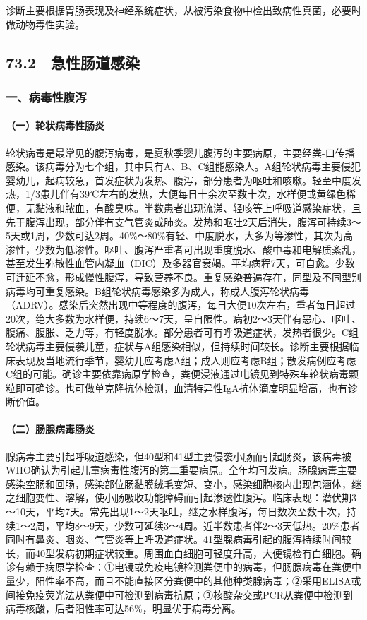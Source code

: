 诊断主要根据胃肠表现及神经系统症状，从被污染食物中检出致病性真菌，必要时做动物毒性实验。

\protect\hypertarget{text00184.html}{}{}

\subsection{73.2　急性肠道感染}

\subsubsection{一、病毒性腹泻}

\paragraph{（一）轮状病毒性肠炎}

轮状病毒是最常见的腹泻病毒，是夏秋季婴儿腹泻的主要病原，主要经粪-口传播感染。该病毒分为七个组，其中只有A、B、C组能感染人。A组轮状病毒主要侵犯婴幼儿，起病较急，首发症状为发热、腹泻，部分患者为呕吐和咳嗽。轻至中度发热，1/3患儿伴有39℃左右的发热，大便每日十余次至数十次，水样便或黄绿色稀便，无黏液和脓血，有酸臭味。半数患者出现流涕、轻咳等上呼吸道感染症状，且先于腹泻出现，部分伴有支气管炎或肺炎。发热和呕吐2天后消失，腹泻可持续3～5天或1周，少数可达2周。40\%～80\%有轻、中度脱水，大多为等渗性，其次为高渗性，少数为低渗性。呕吐、腹泻严重者可出现重度脱水、酸中毒和电解质紊乱，甚至发生弥散性血管内凝血（DIC）及多器官衰竭。平均病程7天，可自愈。少数可迁延不愈，形成慢性腹泻，导致营养不良。重复感染普遍存在，同型及不同型别病毒均可重复感染。B组轮状病毒感染多为成人，称成人腹泻轮状病毒（ADRV）。感染后突然出现中等程度的腹泻，每日大便10次左右，重者每日超过20次，绝大多数为水样便，持续6～7天，呈自限性。病初2～3天伴有恶心、呕吐、腹痛、腹胀、乏力等，有轻度脱水。部分患者可有呼吸道症状，发热者很少。C组轮状病毒主要侵袭儿童，症状与A组感染相似，但持续时间较长。诊断主要根据临床表现及当地流行季节，婴幼儿应考虑A组；成人则应考虑B组；散发病例应考虑C组的可能。确诊主要依靠病原学检查，粪便浸液通过电镜见到特殊车轮状病毒颗粒即可确诊。也可做单克隆抗体检测，血清特异性IgA抗体滴度明显增高，也有诊断价值。

\paragraph{（二）肠腺病毒肠炎}

腺病毒主要引起呼吸道感染，但40型和41型主要侵袭小肠而引起肠炎，该病毒被WHO确认为引起儿童病毒性腹泻的第二重要病原。全年均可发病。肠腺病毒主要感染空肠和回肠，感染部位肠黏膜绒毛变短、变小，感染细胞核内出现包涵体，继之细胞变性、溶解，使小肠吸收功能障碍而引起渗透性腹泻。临床表现：潜伏期3～10天，平均7天。常先出现1～2天呕吐，继之水样腹泻，每日数次至数十次，持续1～2周，平均8～9天，少数可延续3～4周。近半数患者伴2～3天低热。20\%患者同时有鼻炎、咽炎、气管炎等上呼吸道症状。41型腺病毒引起的腹泻持续时间较长，而40型发病初期症状较重。周围血白细胞可轻度升高，大便镜检有白细胞。确诊有赖于病原学检查：①电镜或免疫电镜检测粪便中的病毒，但肠腺病毒在粪便中量少，阳性率不高，而且不能直接区分粪便中的其他种类腺病毒；②采用ELISA或间接免疫荧光法从粪便中可检测到病毒抗原；③核酸杂交或PCR从粪便中检测到病毒核酸，后者阳性率可达56\%，明显优于病毒分离。

